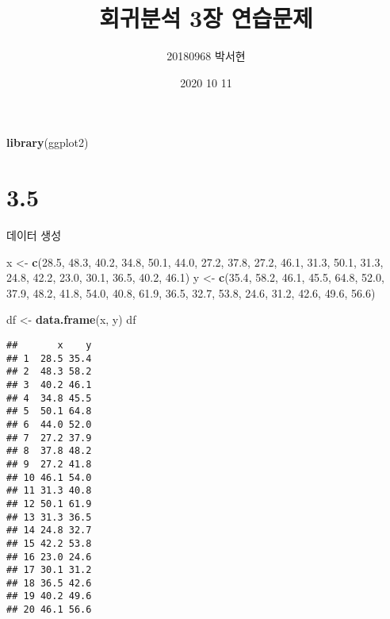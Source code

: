 \documentclass[
]{article}
\title{회귀분석 3장 연습문제}
\author{20180968 박서현}
\date{2020 10 11}
\newenvironment{Shaded}{\begin{snugshade}}{\end{snugshade}}
\newcommand{\FloatTok}[1]{\textcolor[rgb]{0.00,0.00,0.81}{#1}}
\newcommand{\KeywordTok}[1]{\textcolor[rgb]{0.13,0.29,0.53}{\textbf{#1}}}
\newcommand{\NormalTok}[1]{#1}
\newcommand{\StringTok}[1]{\textcolor[rgb]{0.31,0.60,0.02}{#1}}
\begin{document}
\maketitle

\begin{Shaded}
\begin{Highlighting}[]
\KeywordTok{library}\NormalTok{(ggplot2)}
\end{Highlighting}
\end{Shaded}

\hypertarget{section}{%
\section{3.5}\label{section}}

데이터 생성

\begin{Shaded}
\begin{Highlighting}[]
\NormalTok{x <-}\StringTok{ }\KeywordTok{c}\NormalTok{(}\FloatTok{28.5}\NormalTok{, }\FloatTok{48.3}\NormalTok{, }\FloatTok{40.2}\NormalTok{, }\FloatTok{34.8}\NormalTok{, }\FloatTok{50.1}\NormalTok{, }\FloatTok{44.0}\NormalTok{, }\FloatTok{27.2}\NormalTok{, }\FloatTok{37.8}\NormalTok{, }\FloatTok{27.2}\NormalTok{, }\FloatTok{46.1}\NormalTok{, }\FloatTok{31.3}\NormalTok{, }\FloatTok{50.1}\NormalTok{, }\FloatTok{31.3}\NormalTok{, }\FloatTok{24.8}\NormalTok{, }\FloatTok{42.2}\NormalTok{, }\FloatTok{23.0}\NormalTok{, }\FloatTok{30.1}\NormalTok{, }\FloatTok{36.5}\NormalTok{, }\FloatTok{40.2}\NormalTok{, }\FloatTok{46.1}\NormalTok{)}
\NormalTok{y <-}\StringTok{ }\KeywordTok{c}\NormalTok{(}\FloatTok{35.4}\NormalTok{, }\FloatTok{58.2}\NormalTok{, }\FloatTok{46.1}\NormalTok{, }\FloatTok{45.5}\NormalTok{, }\FloatTok{64.8}\NormalTok{, }\FloatTok{52.0}\NormalTok{, }\FloatTok{37.9}\NormalTok{, }\FloatTok{48.2}\NormalTok{, }\FloatTok{41.8}\NormalTok{, }\FloatTok{54.0}\NormalTok{, }\FloatTok{40.8}\NormalTok{, }\FloatTok{61.9}\NormalTok{, }\FloatTok{36.5}\NormalTok{, }\FloatTok{32.7}\NormalTok{, }\FloatTok{53.8}\NormalTok{, }\FloatTok{24.6}\NormalTok{, }\FloatTok{31.2}\NormalTok{, }\FloatTok{42.6}\NormalTok{, }\FloatTok{49.6}\NormalTok{, }\FloatTok{56.6}\NormalTok{)}

\NormalTok{df <-}\StringTok{ }\KeywordTok{data.frame}\NormalTok{(x, y)}
\NormalTok{df}
\end{Highlighting}
\end{Shaded}

\begin{verbatim}
##       x    y
## 1  28.5 35.4
## 2  48.3 58.2
## 3  40.2 46.1
## 4  34.8 45.5
## 5  50.1 64.8
## 6  44.0 52.0
## 7  27.2 37.9
## 8  37.8 48.2
## 9  27.2 41.8
## 10 46.1 54.0
## 11 31.3 40.8
## 12 50.1 61.9
## 13 31.3 36.5
## 14 24.8 32.7
## 15 42.2 53.8
## 16 23.0 24.6
## 17 30.1 31.2
## 18 36.5 42.6
## 19 40.2 49.6
## 20 46.1 56.6
\end{verbatim}
\end{document}
